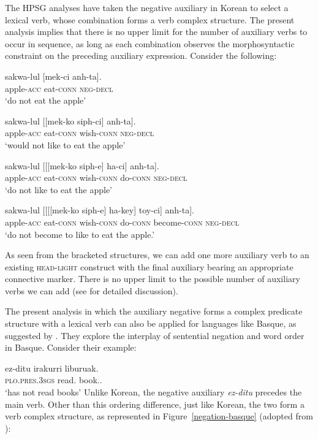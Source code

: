 \documentclass[output=paper
	        ,collection
	        ,collectionchapter
 	        ,biblatex
                ,babelshorthands
                ,newtxmath
                ,draftmode
                ,colorlinks, citecolor=brown
]{langscibook}
\begin{document}
{\begin{exe}
\begin{xlist}
\begin{exe}
\begin{xlist}
The HPSG analyses have taken the negative auxiliary in Korean
to select a lexical verb, whose combination forms a verb complex
structure. The present analysis implies that there is no upper limit for the
number of auxiliary verbs to
occur in sequence, as long as each combination observes
the morphosyntactic constraint on the preceding auxiliary expression. Consider
the following:

\eal
\ex 
\gll sakwa-lul          [mek-ci anh-ta]. \\
     apple-\textsc{acc} \spacebr{}eat-\textsc{conn} \textsc{neg}-\textsc{decl} \\
\glt`do not eat the apple'

\ex 
\gll sakwa-lul          [[mek-ko siph-ci] anh-ta]. \\
     apple-\textsc{acc} \hspaceThis{[[}eat-\textsc{conn} wish-\textsc{conn} \textsc{neg}-\textsc{decl} \\
\glt`would not like to eat the apple'

\ex \label{negation-20c} 
\gll sakwa-lul          [[[mek-ko siph-e] ha-ci] anh-ta]. \\
     apple-\textsc{acc} \hspaceThis{[[[}eat-\textsc{conn} wish-\textsc{conn} do-\textsc{conn} \textsc{neg}-\textsc{decl} \\
\glt`do not like to eat the apple'

\ex 
\gll sakwa-lul          [[[[mek-ko siph-e] ha-key] toy-ci] anh-ta]. \\
     apple-\textsc{acc} \hspaceThis{[[[[}eat-\textsc{conn} wish-\textsc{conn} do-\textsc{conn} become-\textsc{conn} \textsc{neg}-\textsc{decl} \\
\glt`do not become to like to eat the apple.'
\end{xlist} \end{exe}
%
As seen from the bracketed structures, we can add one more auxiliary verb to
an existing \textsc{head-light} construct with the final auxiliary bearing an appropriate
  connective marker. There is no upper limit to the possible number  of auxiliary
  verbs we can add (see \citealt[]{Kim:16} for detailed discussion).

The present analysis in which the auxiliary negative forms a complex
predicate structure with a lexical verb can also be applied for languages
like Basque, as suggested by \citet{CB:11}. They explore the interplay of sentential
negation and word order in Basque. Consider their example:

\ea
\label{negation-basque-ex}
\gll ez-ditu irakurri liburuak. \\
     \textsc{plo}.\textsc{pres}.\textsc{3sgs} read.\PRF{} book.\ABS.\pl\\
\glt `has not read books'
\z
%
%
Unlike Korean, the negative auxiliary \textit{ez-ditu} precedes
the main verb. Other than this ordering difference, just
like Korean, the two form a verb complex structure, as represented in
Figure~\ref{negation-basque} (adopted from \citealt{CB:11}):


\end{xlist}
\end{exe}}
\end{document}
